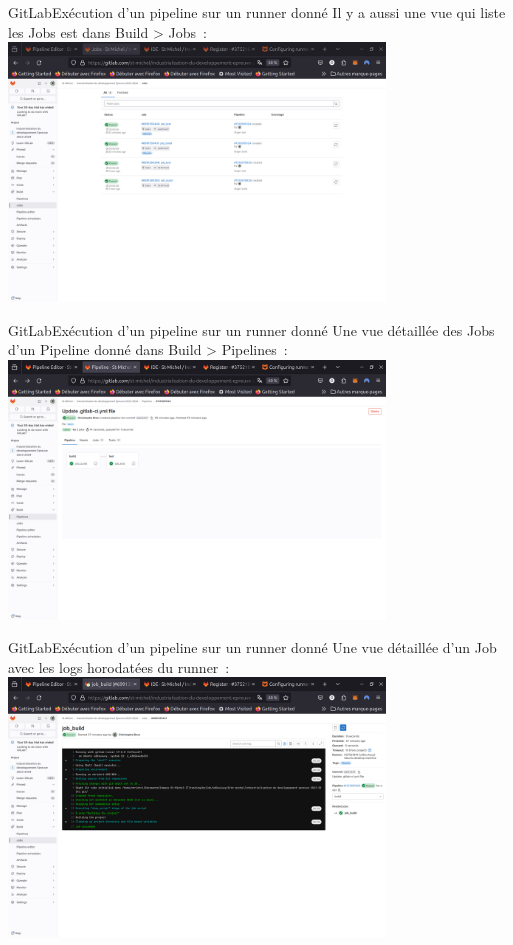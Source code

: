 \documentclass{beamer}
\begin{document}
    \begin{frame}{GitLab}{Exécution d'un pipeline sur un runner donné}
        \transdissolve
        Il y a aussi une vue qui liste les Jobs est dans Build > Jobs~:
        \bigbreak
        \centering
        \includegraphics[width=10cm]{image/gitlab-jobs-executions}
    \end{frame}

    \begin{frame}{GitLab}{Exécution d'un pipeline sur un runner donné}
        \transdissolve
        Une vue détaillée des Jobs d'un Pipeline donné dans Build > Pipelines~:
        \bigbreak
        \centering
        \includegraphics[width=10cm]{image/gitlab-pipeline-jobs-executions}
    \end{frame}

    \begin{frame}{GitLab}{Exécution d'un pipeline sur un runner donné}
        \transdissolve
        Une vue détaillée d'un Job avec les logs horodatées du runner~:
        \bigbreak
        \centering
        \includegraphics[width=10cm]{image/gitlab-pipeline-job-details}
    \end{frame}
\end{document}
